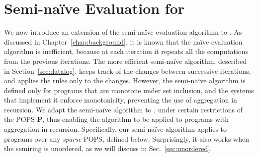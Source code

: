 
\section{Semi-na\"ive Evaluation for \datalogo}
\label{sec:semi-naive}

We now introduce an extension of the semi-na\"ive evaluation
algorithm to \datalogo.  
As discussed in Chapter~\ref{chap:background},
 it is known that the na\"ive evaluation
 algorithm is inefficient, because at each iteration it
 repeats all the computations from the previous iterations.  
The more efficient semi-na\"ive algorithm,
 described in Section~\ref{sec:datalog},
 keeps track of the changes between successive iterations,
 and applies the rules only to the changes.
However, the semi-na\"ive algorithm is defined only for programs that
are monotone under set inclusion, and the systems that implement it
enforce monotonicity, preventing the use of aggregation in
recursion. 
We adapt the semi-na\"ive algorithm to \datalogo, under certain restrictions of the
POPS $\bm P$, thus enabling the algorithm to be applied
to programs with aggregation in recursion.
Specifically, our semi-na\"ive algorithm applies to \datalogo programs
 over any {\em sparse} POPS, defined below.
Surprisingly, it also works when the semiring is unordered, 
 as we will discuss in Sec.~\ref{sec:unordered}.

